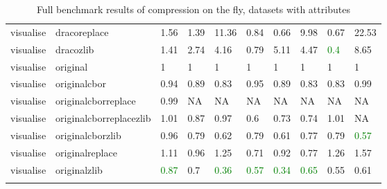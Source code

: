 \begin{landscape}
\begin{longtable}{llllllllll}
visualise & dracoreplace & 1.56 & 1.39 & 11.36 & 0.84 & 0.66 & 9.98 & 0.67 & 22.53\\
visualise & dracozlib & 1.41 & 2.74 & 4.16 & 0.79 & 5.11 & 4.47 & \textcolor{green}{0.4} & 8.65\\
visualise & original & 1 & 1 & 1 & 1 & 1 & 1 & 1 & 1\\
visualise & originalcbor & 0.94 & 0.89 & 0.83 & 0.95 & 0.89 & 0.83 & 0.83 & 0.99\\
visualise & originalcborreplace & 0.99 & NA & NA & NA & NA & NA & NA & NA\\
visualise & originalcborreplacezlib & 1.01 & 0.87 & 0.97 & 0.6 & 0.73 & 0.74 & 1.01 & NA\\
visualise & originalcborzlib & 0.96 & 0.79 & 0.62 & 0.79 & 0.61 & 0.77 & 0.79 & \textcolor{green}{0.57}\\
visualise & originalreplace & 1.11 & 0.96 & 1.25 & 0.71 & 0.92 & 0.77 & 1.26 & 1.57\\
visualise & originalzlib & \textcolor{green}{0.87} & 0.7 & \textcolor{green}{0.36} & \textcolor{green}{0.57} & \textcolor{green}{0.34} & \textcolor{green}{0.65} & 0.55 & 0.61\\*
\caption{Full benchmark results of compression on the fly, datasets with attributes}
\label{tab:fullresultsotfattr}
\end{longtable}





\end{landscape}


